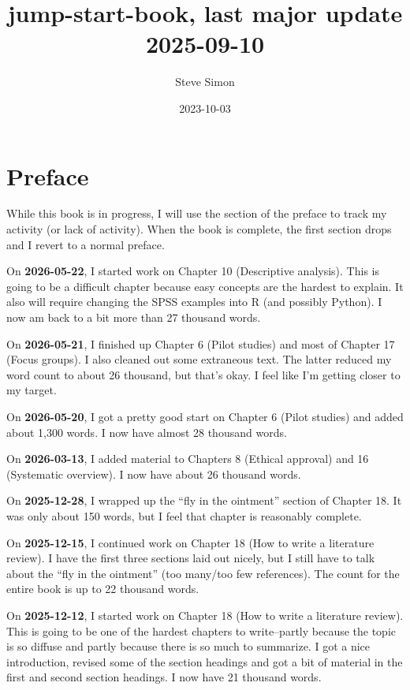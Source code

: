 \documentclass[
  letterpaper,
  DIV=11,
  numbers=noendperiod]{scrreprt}
\title{jump-start-book, last major update 2025-09-10}
\author{Steve Simon}
\date{2023-10-03}
\renewcommand*\contentsname{Table of contents}
\newcommand\contentsname{Table of contents}
\begin{document}
\maketitle

\renewcommand*\contentsname{Table of contents}
{
\setcounter{tocdepth}{2}
\tableofcontents
}


\chapter*{Preface}\label{preface}


While this book is in progress, I will use the section of the preface to
track my activity (or lack of activity). When the book is complete, the
first section drops and I revert to a normal preface.

On \textbf{2026-05-22}, I started work on Chapter 10 (Descriptive
analysis). This is going to be a difficult chapter because easy concepts
are the hardest to explain. It also will require changing the SPSS
examples into R (and possibly Python). I now am back to a bit more than
27 thousand words.

On \textbf{2026-05-21}, I finished up Chapter 6 (Pilot studies) and most
of Chapter 17 (Focus groups). I also cleaned out some extraneous text.
The latter reduced my word count to about 26 thousand, but that's okay.
I feel like I'm getting closer to my target.

On \textbf{2026-05-20}, I got a pretty good start on Chapter 6 (Pilot
studies) and added about 1,300 words. I now have almost 28 thousand
words.

On \textbf{2026-03-13}, I added material to Chapters 8 (Ethical
approval) and 16 (Systematic overview). I now have about 26 thousand
words.

On \textbf{2025-12-28}, I wrapped up the ``fly in the ointment'' section
of Chapter 18. It was only about 150 words, but I feel that chapter is
reasonably complete.

On \textbf{2025-12-15}, I continued work on Chapter 18 (How to write a
literature review). I have the first three sections laid out nicely, but
I still have to talk about the ``fly in the ointment'' (too many/too few
references). The count for the entire book is up to 22 thousand words.

On \textbf{2025-12-12}, I started work on Chapter 18 (How to write a
literature review). This is going to be one of the hardest chapters to
write--partly because the topic is so diffuse and partly because there
is so much to summarize. I got a nice introduction, revised some of the
section headings and got a bit of material in the first and second
section headings. I now have 21 thousand words.
\end{document}
